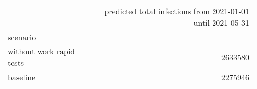 \begin{tabular}{lr}
\toprule
{} &  predicted total infections from 2021-01-01 until 2021-05-31 \\
scenario                  &                                                              \\
\midrule
 without work rapid tests &                                            2633580 \\
 baseline                 &                                            2275946 \\
\bottomrule
\end{tabular}
